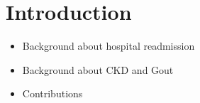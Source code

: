 \section{Introduction}
\label{intro}

\begin{itemize}
	\item Background about hospital readmission
	\item Background about CKD and Gout
	\item Contributions
\end{itemize}





